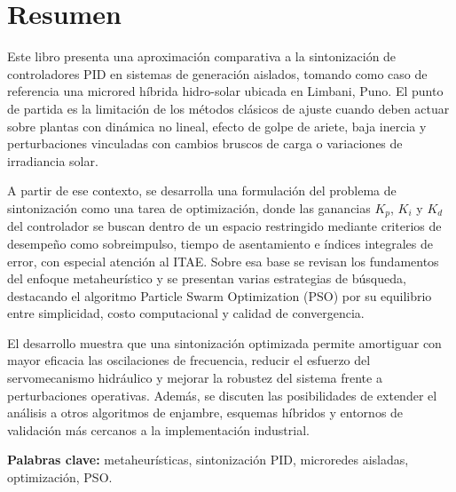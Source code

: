 \chapter*{Resumen}

Este libro presenta una aproximación comparativa a la sintonización de controladores
PID en sistemas de generación aislados, tomando como caso de referencia una microred
híbrida hidro-solar ubicada en Limbani, Puno. El punto de partida es la limitación de
los métodos clásicos de ajuste cuando deben actuar sobre plantas con dinámica no lineal,
efecto de golpe de ariete, baja inercia y perturbaciones vinculadas con cambios bruscos
de carga o variaciones de irradiancia solar.

A partir de ese contexto, se desarrolla una formulación del problema de sintonización como
una tarea de optimización, donde las ganancias $K_p$, $K_i$ y $K_d$ del controlador se
buscan dentro de un espacio restringido mediante criterios de desempeño como sobreimpulso,
tiempo de asentamiento e índices integrales de error, con especial atención al ITAE. Sobre
esa base se revisan los fundamentos del enfoque metaheurístico y se presentan varias
estrategias de búsqueda, destacando el algoritmo Particle Swarm Optimization (PSO) por
su equilibrio entre simplicidad, costo computacional y calidad de convergencia.

El desarrollo muestra que una sintonización optimizada permite amortiguar con mayor
eficacia las oscilaciones de frecuencia, reducir el esfuerzo del servomecanismo hidráulico
y mejorar la robustez del sistema frente a perturbaciones operativas. Además, se discuten
las posibilidades de extender el análisis a otros algoritmos de enjambre, esquemas híbridos
y entornos de validación más cercanos a la implementación industrial.

\bigskip
\noindent\textbf{Palabras clave:} metaheurísticas, sintonización PID, microredes aisladas, optimización, PSO.
